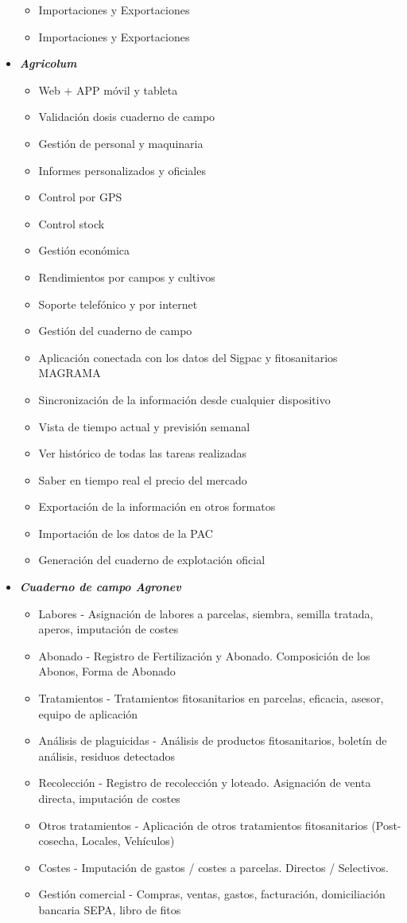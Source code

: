\begin{itemize}
\begin{itemize}
\item Importaciones y Exportaciones 
\item Importaciones y Exportaciones 
\end{itemize}
\item \textbf{\textit{Agricolum}} \cite{agricolum}
\begin{itemize}
\item Web + APP móvil y tableta
\item Validación dosis cuaderno de campo
\item Gestión de personal y maquinaria
\item Informes personalizados y oficiales
\item Control por GPS
\item Control stock
\item Gestión económica
\item Rendimientos por campos y cultivos
\item Soporte telefónico y por internet
\item Gestión del cuaderno de campo
\item Aplicación conectada con los datos del Sigpac y fitosanitarios MAGRAMA
\item Sincronización de la información desde cualquier dispositivo
\item Vista de tiempo actual y previsión semanal
\item Ver histórico de todas las tareas realizadas
\item Saber en tiempo real el precio del mercado
\item Exportación de la información en otros formatos
\item Importación de los datos de la PAC
\item Generación del cuaderno de explotación oficial
\end{itemize}
\item \textbf{\textit{Cuaderno de campo Agronev}} \cite{agronev}
\begin{itemize}
\item Labores - Asignación de labores a parcelas, siembra, semilla tratada, aperos, imputación de costes
\item Abonado - Registro de Fertilización y Abonado. Composición de los Abonos, Forma de Abonado
\item Tratamientos - Tratamientos fitosanitarios en parcelas, eficacia, asesor, equipo de aplicación
\item Análisis de plaguicidas - Análisis de productos fitosanitarios, boletín de análisis, residuos detectados
\item Recolección - Registro de recolección y loteado. Asignación de venta directa, imputación de costes
\item Otros tratamientos - Aplicación de otros tratamientos fitosanitarios (Post-cosecha, Locales, Vehículos)
\item Costes - Imputación de gastos / costes a parcelas. Directos / Selectivos.
\item Gestión comercial - Compras, ventas, gastos, facturación, domiciliación bancaria SEPA, libro de fitos 
\end{itemize}
\end{itemize}

